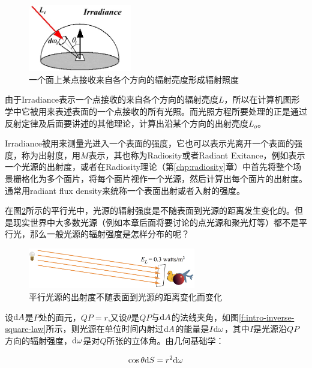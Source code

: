 \begin{figure}
\sidecaption
	\includegraphics[width=0.4\textwidth]{figures/intro/irradiance}
	\caption{一个面上某点接收来自各个方向的辐射亮度形成辐射照度}
	\label{f:intro-irradiance}
\end{figure}

由于Irradiance表示一个点接收的来自各个方向的辐射亮度$L$，所以在计算机图形学中它被用来表述表面的一个点接收的所有光照。而光照方程所要处理的正是通过反射定律及后面要讲述的其他理论，计算出沿某个方向的出射亮度$L_o$。

Irradiance被用来测量光进入一个表面的强度，它也可以表示光离开一个表面的强度，称为出射度，用$M$表示，其也称为Radiosity或者Radiant Exitance，例如表示一个光源的出射度，或者在Radiosity理论（第\ref{chp:radiosity}章）中首先将整个场景栅格化为多个面片，将每个面片视作一个光源，然后计算出每个面片的出射度。通常用radiant flux density来统称一个表面出射或者入射的强度。

在图\ref{f:intro-directional-irradiance}所示的平行光中，光源的辐射强度是不随表面到光源的距离发生变化的。但是现实世界中大多数光源（例如本章后面将要讨论的点光源和聚光灯等）都不是平行光，那么一般光源的辐射强度是怎样分布的呢？

\begin{figure}
\sidecaption
	\includegraphics[width=0.65\textwidth]{figures/intro/directional-irradiance}
	\caption{平行光源的出射度不随表面到光源的距离变化而变化}
	\label{f:intro-directional-irradiance}
\end{figure}

设${\rm d}A$是$P$处的面元，$QP=r$,又设$\theta$是$QP$与${\rm d}A$的法线夹角，如图\ref{f:intro-inverse-square-law}所示，则光源在单位时间内射过${\rm d}A$的能量是$I{\rm d}\omega$，其中$I$是光源沿$QP$方向的辐射强度，${\rm d}\omega$是对$Q$所张的立体角。由几何基础学：

\begin{equation}
	\cos\theta {\rm d}S=r^{2}{\rm d}\omega
\end{equation}



